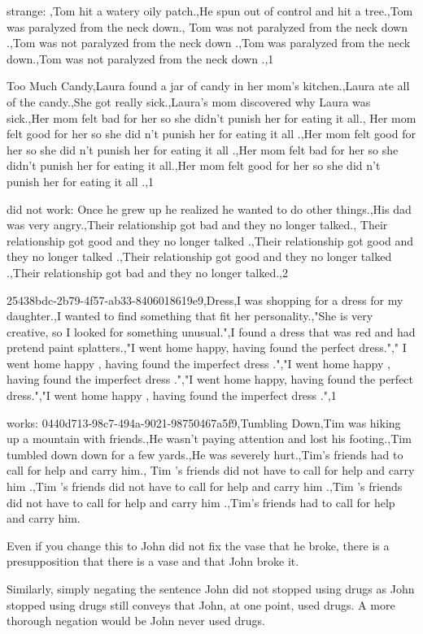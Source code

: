 \documentclass{article}
\begin{document}
strange: ,Tom hit a watery oily patch.,He spun out of control and hit a tree.,Tom was paralyzed from the neck down., Tom was not paralyzed from the neck down .,Tom was not paralyzed from the neck down .,Tom was paralyzed from the neck down.,Tom was not paralyzed from the neck down .,1

Too Much Candy,Laura found a jar of candy in her mom's kitchen.,Laura ate all of the candy.,She got really sick.,Laura's mom discovered why Laura was sick.,Her mom felt bad for her so she didn't punish her for eating it all., Her mom felt good for her so she did n't punish her for eating it all .,Her mom felt good for her so she did n't punish her for eating it all .,Her mom felt bad for her so she didn't punish her for eating it all.,Her mom felt good for her so she did n't punish her for eating it all .,1

did not work:
Once he grew up he realized he wanted to do other things.,His dad was very angry.,Their relationship got bad and they no longer talked., Their relationship got good and they no longer talked .,Their relationship got good and they no longer talked .,Their relationship got good and they no longer talked .,Their relationship got bad and they no longer talked.,2

25438bdc-2b79-4f57-ab33-8406018619e9,Dress,I was shopping for a dress for my daughter.,I wanted to find something that fit her personality.,"She is very creative, so I looked for something unusual.",I found a dress that was red and had pretend paint splatters.,"I went home happy, having found the perfect dress."," I went home happy , having found the imperfect dress .","I went home happy , having found the imperfect dress .","I went home happy, having found the perfect dress.","I went home happy , having found the imperfect dress .",1

works:
0440d713-98c7-494a-9021-98750467a5f9,Tumbling Down,Tim was hiking up a mountain with friends.,He wasn't paying attention and lost his footing.,Tim tumbled down down for a few yards.,He was severely hurt.,Tim's friends had to call for help and carry him., Tim 's friends did not have to call for help and carry him .,Tim 's friends did not have to call for help and carry him .,Tim 's friends did not have to call for help and carry him .,Tim's friends had to call for help and carry him.

Even if you change this to John did not fix the vase that he broke, there is a presupposition that there is a vase and that John broke it.

Similarly, simply negating the sentence John did not stopped using drugs as John stopped using drugs still conveys that John, at one point, used drugs. A more thorough negation would be John never used drugs.
\end{document}
